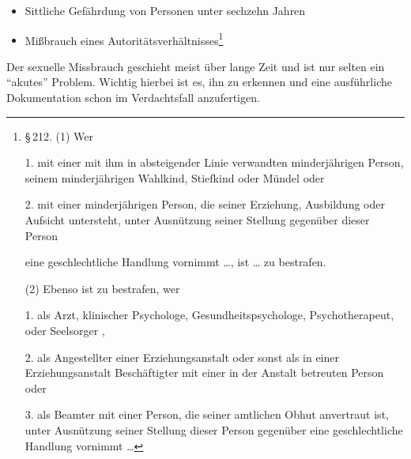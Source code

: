 {\begin{itemize}
{  (2) Wer an einer Person, die das 16. Lebensjahr noch nicht
  vollendet hat,  dieser
  Person eine geschlechtliche Handlung vornimmt, {\ldots}, ist
  {\ldots} zu bestrafen.
  
  (3) Wer eine Person, die das 18. Lebensjahr noch nicht
  vollendet hat, unmittelbar durch ein Entgelt dazu verleitet,
  eine geschlechtliche Handlung {\ldots} vorzunehmen {\ldots},
  ist {\ldots} zu bestrafen.
  } \item Sittliche Gefährdung von Personen unter sechzehn
  Jahren
  \item Mißbrauch eines Autoritätsverhältnisses\footnote{%
  {\S}\,212. (1) Wer
  
  1. mit einer mit ihm in absteigender Linie verwandten minderjährigen Person, seinem
  minderjährigen Wahlkind, Stiefkind oder Mündel oder
  
  2. mit einer minderjährigen Person, die seiner Erziehung, Ausbildung oder Aufsicht
  untersteht, unter Ausnützung seiner Stellung gegenüber dieser Person
  
  eine geschlechtliche Handlung vornimmt {\ldots}, ist {\ldots} zu bestrafen.
  
  (2) Ebenso ist zu bestrafen, wer
  
  1. als Arzt, klinischer Psychologe, Gesundheitspsychologe, Psychotherapeut,
   oder Seelsorger
  ,
  
  2. als Angestellter einer Erziehungsanstalt oder sonst als in einer
  Erziehungsanstalt Beschäftigter mit einer in der Anstalt betreuten Person oder
  
  3. als Beamter mit einer Person, die seiner amtlichen Obhut anvertraut ist,
  unter Ausnützung seiner Stellung dieser Person gegenüber eine geschlechtliche
  Handlung vornimmt {\ldots}
  }
\end{itemize}
Der sexuelle Missbrauch geschieht meist über lange Zeit und
ist nur selten ein \enquote{akutes} Problem. Wichtig hierbei ist
es, ihn zu erkennen und eine ausführliche Dokumentation
schon im Verdachtsfall anzufertigen.
}%


